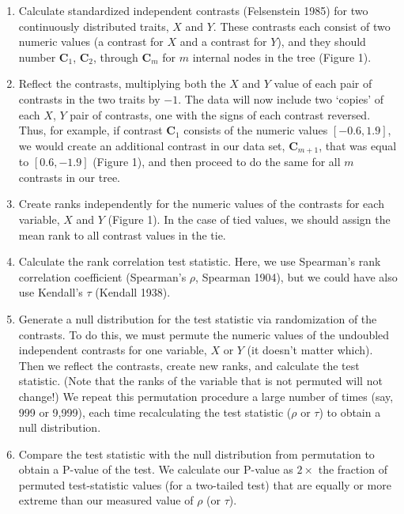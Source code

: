 \documentclass[fleqn,10pt,lineno]{wlpeerj} %
\begin{document}
\begin{enumerate}
\def\labelenumi{\arabic{enumi}.}
\item
  Calculate standardized independent contrasts (Felsenstein 1985) for two continuously distributed traits, \(X\) and \(Y\). These contrasts each consist of two numeric values (a contrast for \(X\) and a contrast for \(Y\)), and they should number \(\textbf{C}_1\), \(\textbf{C}_2\), through \(\textbf{C}_m\) for \(m\) internal nodes in the tree (Figure 1).
\item
  Reflect the contrasts, multiplying both the \(X\) and \(Y\) value of each pair of contrasts in the two traits by \(-1\). The data will now include two `copies' of each \(X\), \(Y\) pair of contrasts, one with the signs of each contrast reversed. Thus, for example, if contrast \(\textbf{C}_1\) consists of the numeric values \([-0.6,1.9]\), we would create an additional contrast in our data set, \(\textbf{C}_{m+1}\), that was equal to \([0.6,-1.9]\) (Figure 1), and then proceed to do the same for all \(m\) contrasts in our tree.
\item
  Create ranks independently for the numeric values of the contrasts for each variable, \(X\) and \(Y\) (Figure 1). In the case of tied values, we should assign the mean rank to all contrast values in the tie.
\item
  Calculate the rank correlation test statistic. Here, we use Spearman's rank correlation coefficient (Spearman's \(\rho\), Spearman 1904), but we could have also use Kendall's \(\tau\) (Kendall 1938).
\item
  Generate a null distribution for the test statistic via randomization of the contrasts. To do this, we must permute the numeric values of the undoubled independent contrasts for one variable, \(X\) or \(Y\) (it doesn't matter which). Then we reflect the contrasts, create new ranks, and calculate the test statistic. (Note that the ranks of the variable that is not permuted will not change!) We repeat this permutation procedure a large number of times (say, 999 or 9,999), each time recalculating the test statistic (\(\rho\) or \(\tau\)) to obtain a null distribution.
\item
  Compare the test statistic with the null distribution from permutation to obtain a P-value of the test. We calculate our P-value as \(2 \times\) the fraction of permuted test-statistic values (for a two-tailed test) that are equally or more extreme than our measured value of \(\rho\) (or \(\tau\)).
\end{enumerate}
\end{document}
